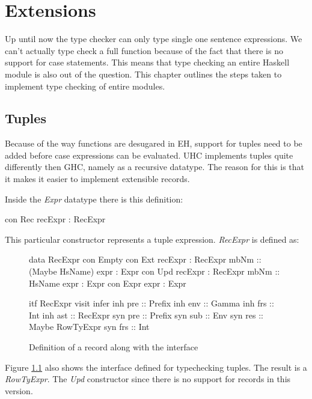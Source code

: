 \chapter{Extensions}
\label{cap:Extensions}
Up until now the type checker can only type single one sentence expressions. We can't actually type check a full function because of the fact that there is no support for case statements. This means that type checking an entire Haskell module is also out of the question. This chapter outlines the steps taken to implement type checking of entire modules.

\section{Tuples}
Because of the way functions are desugared in EH, support for tuples need to  be added before case expressions can be evaluated. UHC implements tuples quite differently then GHC, namely as a recursive datatype. The reason for this is that it makes it easier to implement extensible records.

Inside the \emph{Expr} datatype there is this definition:
\begin{code}
  con Rec
    recExpr       :  RecExpr
\end{code}

This particular constructor represents a tuple expression. \emph{RecExpr} is defined as:

\begin{figure}[H]
\begin{minipage}[t]{0.5\linewidth}
\begin{code}
data RecExpr
  con Empty
  con Ext
    recExpr     :  RecExpr
    mbNm        :: (Maybe HsName)
    expr        :  Expr
  con Upd
    recExpr     :  RecExpr
    mbNm        :: HsName
    expr        :  Expr
  con Expr
    expr        :  Expr
\end{code}
\end{minipage}
\begin{minipage}[t]{0.5\linewidth}
\begin{code}
itf RecExpr
  visit infer
    inh pre :: Prefix
    inh env :: Gamma
    inh frs :: Int
    inh ast :: RecExpr
    syn pre :: Prefix
    syn sub :: Env
    syn res :: Maybe RowTyExpr
    syn frs :: Int 
\end{code}
\end{minipage}
\label{record}
\caption{Definition of a record along with the interface}
\end{figure}
Figure \ref{record} also shows the interface defined for typechecking tuples. The result is a \emph{RowTyExpr}. The \emph{Upd} constructor since there is no support for records in this version.

